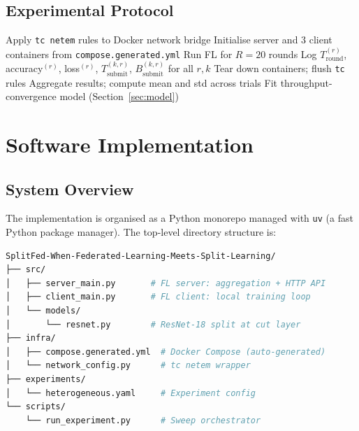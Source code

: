 \documentclass[12pt,a4paper]{report}
\begin{document}
\section{Experimental Protocol}

\begin{algorithm}[H]
\caption{QoS Sweep Experiment Protocol}
\label{alg:sweep}
\begin{algorithmic}[1]
    \State Apply \texttt{tc netem} rules to Docker network bridge
    \State Initialise server and 3 client containers from \texttt{compose.generated.yml}
    \State Run FL for $R = 20$ rounds
    \State Log $T_{\mathrm{round}}^{(r)}$, accuracy$^{(r)}$, loss$^{(r)}$, $T_{\mathrm{submit}}^{(k,r)}$, $B_{\mathrm{submit}}^{(k,r)}$ for all $r, k$
    \State Tear down containers; flush \texttt{tc} rules
  \EndFor
\EndFor
\State Aggregate results; compute mean and std across trials
\State Fit throughput-convergence model (Section~\ref{sec:model})
\end{algorithmic}
\end{algorithm}

\chapter{Software Implementation}
\label{ch:impl}
\section{System Overview}
\label{sec:impl}

The implementation is organised as a Python monorepo managed with \texttt{uv} (a fast Python package manager). The top-level directory structure is:

\begin{lstlisting}[language=bash, caption={Repository structure}, label=lst:repo]
SplitFed-When-Federated-Learning-Meets-Split-Learning/
├── src/
│   ├── server_main.py       # FL server: aggregation + HTTP API
│   ├── client_main.py       # FL client: local training loop
│   └── models/
│       └── resnet.py        # ResNet-18 split at cut layer
├── infra/
│   ├── compose.generated.yml  # Docker Compose (auto-generated)
│   └── network_config.py      # tc netem wrapper
├── experiments/
│   └── heterogeneous.yaml     # Experiment config
└── scripts/
    └── run_experiment.py      # Sweep orchestrator
\end{lstlisting}
\end{document}

